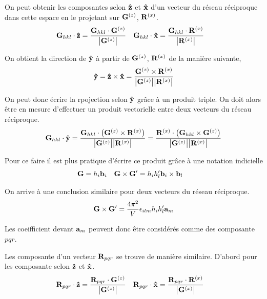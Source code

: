 \documentclass[11pt]{article}
\begin{document}
On peut obtenir les composantes selon $\vu{z}$ et $\vu{x}$ d'un vecteur du réseau réciproque dans cette espace en le projetant sur $\vb{G}^{(z)}$, $\vb{R}^{(x)}$. 
\begin{align*}
	\vb{G}_{hkl} \cdot \vu{z} &= \frac{\vb{G}_{hkl} \cdot \vb{G}^{(z)}}{\abs{\vb{G}^{(z)}}} &
	\vb{G}_{hkl} \cdot \vu{x} &= \frac{\vb{G}_{hkl} \cdot \vb{R}^{(x)}}{\abs{\vb{R}^{(x)}}}
\end{align*}

On obtient la direction de $\vu{y}$ à partir de $\vb{G}^{(z)}$, $\vb{R}^{(x)}$ de la manière suivante,
\begin{align*}
	\vu{y} = \vu{z} \times \vu{x} = \frac{\vb{G}^{(z)}\times \vb{R}^{(x)}}{\abs{\vb{G}^{(z)}}\abs{\vb{R}^{(x)}}}
\end{align*}

On peut donc écrire la rpojection selon $\vu{y}$ grâce à un produit triple. On doit alors être en mesure d'effectuer un produit vectorielle entre deux vecteurs du réseau réciproque.
\begin{align*}
	\vb{G}_{hkl} \cdot \vu{y} = \frac{\vb{G}_{hkl} \cdot \pqty{\vb{G}^{(z)}\times \vb{R}^{(x)}}}{\abs{\vb{G}^{(z)}}\abs{\vb{R}^{(x)}}} 
	= \frac{\vb{R}^{(x)}  \cdot \pqty{\vb{G}_{hkl} \times \vb{G}^{(z)}}}{\abs{\vb{G}^{(z)}}\abs{\vb{R}^{(x)}}}
\end{align*}

Pour ce faire il est plus pratique d'écrire ce produit grâce à une notation indicielle
\begin{align*}
	\vb{G} &= h_i \vb{b}_i & \vb{G} \times \vb{G}^\prime &= h_i h_l^\prime \vb{b}_i \times \vb{b}_l
\end{align*}

 On arrive à une conclusion similaire pour deux vecteurs du réseau réciproque.
\begin{align*}
	\vb{G} \times \vb{G}^\prime = \frac{4\pi^2}{V} \epsilon_{ilm}  h_i h_l^\prime  \vb{a}_m
\end{align*}

Les coeifficient devant $\vb{a}_m$ peuvent donc être considérés comme des composante $pqr$.

Les composante d'un vecteur $\vb{R}_{pqr}$ se trouve de manière similaire. D'abord pour les composante selon $\vu{z}$ et $\vu{x}$.
\begin{align*}
	\vb{R}_{pqr} \cdot \vu{z} &= \frac{\vb{R}_{pqr} \cdot \vb{G}^{(z)}}{\abs{\vb{G}^{(z)}}} &
	\vb{R}_{pqr} \cdot \vu{x} &= \frac{\vb{R}_{pqr} \cdot \vb{R}^{(x)}}{\abs{\vb{G}^{(x)}}}
\end{align*}
\end{document}
